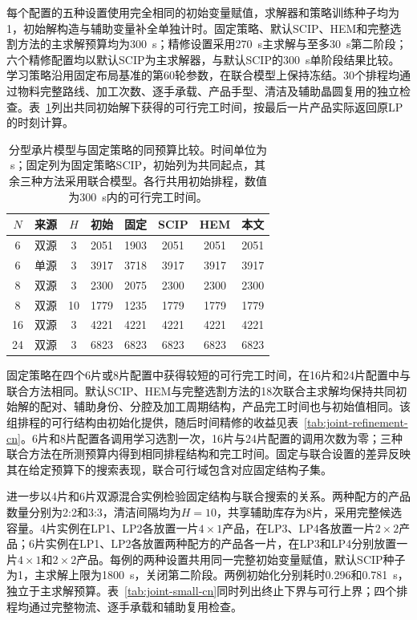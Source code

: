 \documentclass[final,5p,times,twocolumn]{elsarticle}
\begin{document}
每个配置的五种设置使用完全相同的初始变量赋值，求解器和策略训练种子均为1，初始解构造与辅助变量补全单独计时。固定策略、默认SCIP、HEM和完整选割方法的主求解预算均为300~s；精修设置采用270~s主求解与至多30~s第二阶段；六个精修配置均以默认SCIP为主求解器，与默认SCIP的300~s单阶段结果比较。学习策略沿用固定布局基准的第60轮参数，在联合模型上保持冻结。30个排程均通过物料完整路线、加工次数、逐手承载、产品手型、清洁及辅助晶圆复用的独立检查。表~\ref{tab:joint-search-cn}列出共同初始解下获得的可行完工时间，按最后一片产品实际返回原LP的时刻计算。

\begin{table}[!t]
\centering\scriptsize\setlength{\tabcolsep}{2pt}
\caption{分型承片模型与固定策略的同预算比较。时间单位为s；固定列为固定策略SCIP，初始列为共同起点，其余三种方法采用联合模型。各行共用初始排程，数值为300~s内的可行完工时间。}
\label{tab:joint-search-cn}
\begin{tabular}{cccccccc}\toprule
$N$ & 来源 & $H$ & 初始 & 固定 & SCIP & HEM & 本文\\\midrule
6 & 双源 & 3 & 2051 & 1903 & 2051 & 2051 & 2051\\
6 & 单源 & 3 & 3917 & 3718 & 3917 & 3917 & 3917\\
8 & 双源 & 3 & 2300 & 2075 & 2300 & 2300 & 2300\\
8 & 双源 & 10 & 1779 & 1235 & 1779 & 1779 & 1779\\
16 & 双源 & 3 & 4221 & 4221 & 4221 & 4221 & 4221\\
24 & 双源 & 3 & 6823 & 6823 & 6823 & 6823 & 6823\\
\bottomrule\end{tabular}\end{table}

固定策略在四个6片或8片配置中获得较短的可行完工时间，在16片和24片配置中与联合方法相同。默认SCIP、HEM与完整选割方法的18次联合主求解均保持共同初始解的配对、辅助身份、分腔及加工周期结构，产品完工时间也与初始值相同。该组排程的可行结构由初始化提供，随后时间精修的收益见表~\ref{tab:joint-refinement-cn}。6片和8片配置各调用学习选割一次，16片与24片配置的调用次数为零；三种联合方法在所测预算内得到相同排程结构和完工时间。固定与联合设置的差异反映其在给定预算下的搜索表现，联合可行域包含对应固定结构子集。

进一步以4片和6片双源混合实例检验固定结构与联合搜索的关系。两种配方的产品数量分别为2:2和3:3，清洁间隔均为$H=10$，共享辅助库存为8片，采用完整候选容量。4片实例在LP1、LP2各放置一片$4\times1$产品，在LP3、LP4各放置一片$2\times2$产品；6片实例在LP1、LP2各放置两种配方的产品各一片，在LP3和LP4分别放置一片$4\times1$和$2\times2$产品。每例的两种设置共用同一完整初始变量赋值，默认SCIP种子为1，主求解上限为1800~s，关闭第二阶段。两例初始化分别耗时0.296和0.781~s，独立于主求解预算。表~\ref{tab:joint-small-cn}同时列出终止下界与可行上界；四个排程均通过完整物流、逐手承载和辅助复用检查。
\end{document}
